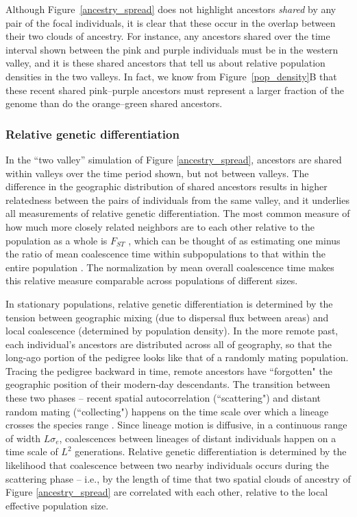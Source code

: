 \documentclass{ar-1col}
\begin{document}
Although Figure~\ref{ancestry_spread} does not highlight 
ancestors \textit{shared} by any pair of the focal individuals,
it is clear that these occur in the overlap between their two clouds of ancestry.
For instance, any ancestors shared over the time interval shown
between the pink and purple individuals
must be in the western valley,
and it is these shared ancestors that tell us about relative population densities in the two valleys.
In fact, we know from Figure~\ref{pop_density}B that these recent shared pink--purple ancestors
must represent a larger fraction of the genome
than do the orange--green shared ancestors.


\subsubsection{Relative genetic differentiation}

In the ``two valley'' simulation of Figure \ref{ancestry_spread},
ancestors are shared within valleys over the time period shown,
but not between valleys.
The difference in the geographic distribution of shared ancestors 
results in higher relatedness between the pairs of individuals 
from the same valley, 
and it underlies all measurements of relative genetic differentiation.
The most common measure of
how much more closely related neighbors are to each other relative to the population as a whole
is $F_{ST}$ \citep{Wright1951},
which can be thought of as estimating
one minus the ratio of mean coalescence time within subpopulations
to that within the entire population \citep{slatkin_1991inbreeding}.
The normalization by mean overall coalescence time 
makes this relative measure comparable across populations of different sizes.

In stationary populations,
relative genetic differentiation is determined by the tension between 
geographic mixing (due to dispersal flux between areas)
and local coalescence (determined by population density).
In the more remote past, each individual's ancestors are distributed across
all of geography,
so that the long-ago portion of the pedigree looks like that of a randomly mating population.
Tracing the pedigree backward in time, 
remote ancestors have ``forgotten" the geographic position of their 
modern-day descendants.
The transition between these two phases -- recent spatial autocorrelation 
(``scattering") and distant random mating (``collecting")
\citep{Wakeley1999,wilkins2004separationoftimescales}
happens on the time scale over which a lineage crosses the species range \citep{Wakeley1999}.
Since lineage motion is diffusive, in a continuous range of width $L \sigma_e$,
coalescences between lineages of distant individuals happen on a time scale of $L^2$ generations.
Relative genetic differentiation
is determined by the likelihood that coalescence between two nearby individuals
occurs during the scattering phase
-- i.e., by the length of time that two spatial clouds of ancestry of Figure \ref{ancestry_spread}
are correlated with each other,
relative to the local effective population size.
\end{document}
